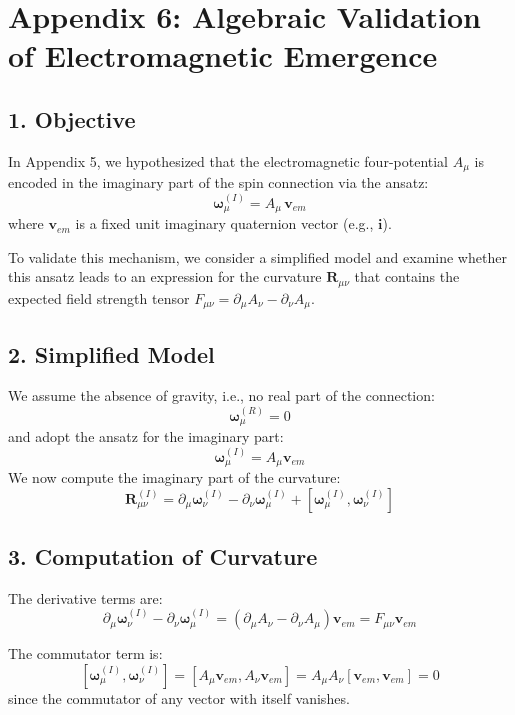 \section*{Appendix 6: Algebraic Validation of Electromagnetic Emergence}

\subsection*{1. Objective}

In Appendix 5, we hypothesized that the electromagnetic four-potential \( A_\mu \) is encoded in the imaginary part of the spin connection via the ansatz:
\[
\boldsymbol{\omega}_{\mu}^{(I)} = A_\mu \, \mathbf{v}_{em}
\]
where \( \mathbf{v}_{em} \) is a fixed unit imaginary quaternion vector (e.g., \( \mathbf{i} \)).

To validate this mechanism, we consider a simplified model and examine whether this ansatz leads to an expression for the curvature \( \mathbf{R}_{\mu\nu} \) that contains the expected field strength tensor \( F_{\mu\nu} = \partial_\mu A_\nu - \partial_\nu A_\mu \).

\subsection*{2. Simplified Model}

We assume the absence of gravity, i.e., no real part of the connection:
\[
\boldsymbol{\omega}_\mu^{(R)} = 0
\]
and adopt the ansatz for the imaginary part:
\[
\boldsymbol{\omega}_\mu^{(I)} = A_\mu \mathbf{v}_{em}
\]
We now compute the imaginary part of the curvature:
\[
\mathbf{R}_{\mu\nu}^{(I)} = \partial_\mu \boldsymbol{\omega}_\nu^{(I)} - \partial_\nu \boldsymbol{\omega}_\mu^{(I)} + [\boldsymbol{\omega}_\mu^{(I)}, \boldsymbol{\omega}_\nu^{(I)}]
\]

\subsection*{3. Computation of Curvature}

The derivative terms are:
\[
\partial_\mu \boldsymbol{\omega}_\nu^{(I)} - \partial_\nu \boldsymbol{\omega}_\mu^{(I)} = (\partial_\mu A_\nu - \partial_\nu A_\mu) \mathbf{v}_{em} = F_{\mu\nu} \mathbf{v}_{em}
\]

The commutator term is:
\[
[\boldsymbol{\omega}_\mu^{(I)}, \boldsymbol{\omega}_\nu^{(I)}] = [A_\mu \mathbf{v}_{em}, A_\nu \mathbf{v}_{em}] = A_\mu A_\nu [\mathbf{v}_{em}, \mathbf{v}_{em}] = 0
\]
since the commutator of any vector with itself vanishes.

